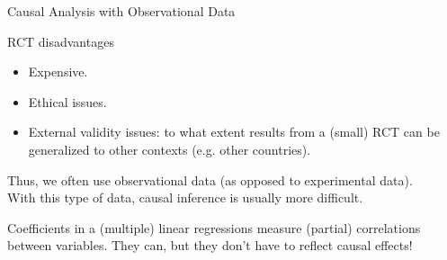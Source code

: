 \documentclass[11pt, aspectratio = 169]{beamer}
\begin{document}
\begin{frame}{Causal Analysis with Observational Data}

RCT disadvantages
\begin{itemize}
    \item Expensive.
    \item Ethical issues.
    \item External validity issues: to what extent results from a (small) RCT can be generalized to other contexts (e.g. other countries).
\end{itemize}
\pause
Thus, we often use observational data (as opposed to experimental data).
\\
With this type of data, causal inference is usually more difficult.

Coefficients in a (multiple) linear regressions measure \alert{(partial) correlations} between variables.
\alert{They can, but they don’t have to reflect causal effects!}
\end{frame}
\end{document}
